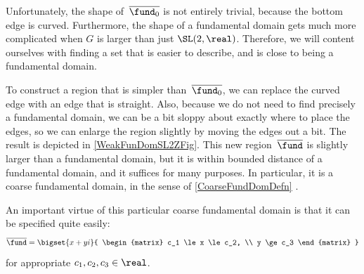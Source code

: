 %
%

Unfortunately, the shape of~$\overline{\fund_0}$ is not entirely trivial, because the bottom edge is curved. Furthermore, the shape of a fundamental domain gets much more complicated when $G$ is larger than just $\SL(2,\real)$. Therefore, we will content ourselves with finding a set that is easier to describe, and is close to being a fundamental domain. 

\begin{eg}
To construct a region that is simpler than~$\overline{\fund_0}$, we can replace the curved edge with an edge that is straight. Also, because we do not need to find precisely a fundamental domain, we can be a bit sloppy about exactly where to place the edges, so we can enlarge the region slightly by moving the edges out a bit. The result is depicted in 
\cref{WeakFunDomSL2ZFig}. %
This new region~$\overline{\fund}$ is slightly larger than a fundamental domain, but it is within bounded distance of a fundamental domain,  and it suffices for many purposes. In particular, it is a coarse fundamental domain, in the sense of \cref{CoarseFundDomDefn} .

An important virtue of this particular coarse fundamental domain is that it can be specified quite easily:
	$$ \overline{\fund} = \bigset{x + y i }{ \begin{matrix} c_1 \le x \le c_2, \\ y \ge c_3 \end{matrix} } $$
for appropriate $c_1, c_2, c_3 \in \real$.
\end{eg}

